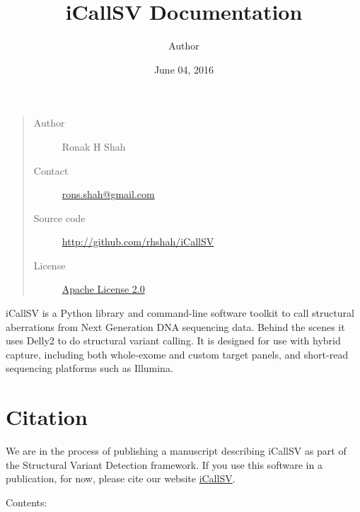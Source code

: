 \documentclass[letterpaper,10pt,english]{sphinxmanual}
\title{iCallSV Documentation}
\date{June 04, 2016}
\author{Author}
\begin{document}
\maketitle
\tableofcontents
{}\label{index::doc}

\begin{quote}\begin{description}
\item[{Author}] \leavevmode
Ronak H Shah

\item[{Contact}] \leavevmode
\href{mailto:rons.shah@gmail.com}{rons.shah@gmail.com}

\item[{Source code}] \leavevmode
\href{http://github.com/rhshah/iCallSV}{http://github.com/rhshah/iCallSV}

\item[{License}] \leavevmode
\href{http://www.apache.org/licenses/LICENSE-2.0}{Apache License 2.0}

\end{description}\end{quote}
\href{https://landscape.io/github/rhshah/iCallSV/master}{}
iCallSV is a Python library and command-line software toolkit to call structural aberrations from Next Generation DNA sequencing data. Behind the scenes it uses Delly2 to do structural variant calling. It is designed for use with hybrid capture, including both whole-exome and custom target panels, and
short-read sequencing platforms such as Illumina.


\chapter{Citation}
\label{index:citation}\label{index:icallsv-structural-aberration-detection-from-ngs-datasets}
We are in the process of publishing a manuscript describing iCallSV as part of the Structural Variant Detection framework.
If you use this software in a publication, for now, please cite our website \href{http://github.com/rhshah/iCallSV}{iCallSV}.

Contents:
\end{document}
